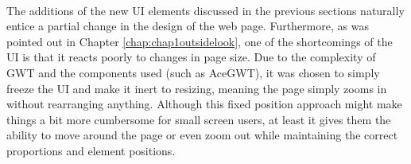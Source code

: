 \paragraph{}
The additions of the new UI elements discussed in the previous sections naturally entice a partial change in the design of the web page. Furthermore, as was pointed out in Chapter \ref{chap:chap1outsidelook}, one of the shortcomings of the UI is that it reacts poorly to changes in page size. Due to the complexity of GWT and the components used (such as AceGWT), it was chosen to simply freeze the UI and make it inert to resizing, meaning the page simply zooms in without rearranging anything. Although this fixed position approach might make things a bit more cumbersome for small screen users, at least it gives them the ability to move around the page or even zoom out while maintaining the correct proportions and element positions.
